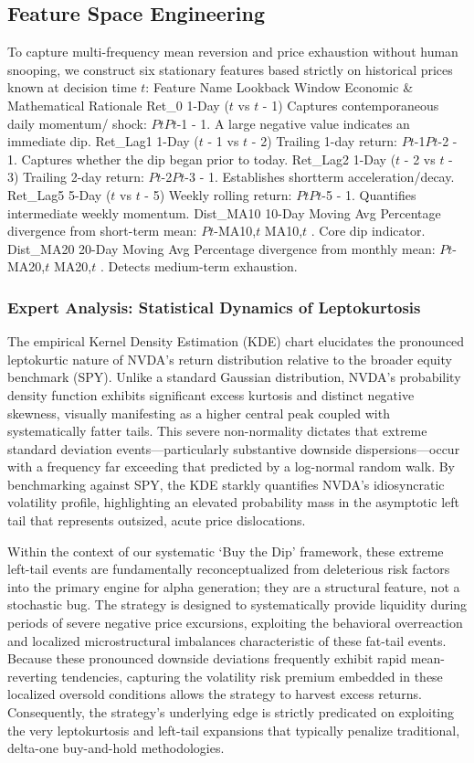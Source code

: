 \documentclass[12pt, a4paper]{article}
\begin{document}
\subsection{Feature Space Engineering}
To capture multi-frequency mean reversion and price exhaustion without human snooping, we construct 
six stationary features based strictly on historical prices known at decision time $t$:
Feature Name Lookback Window Economic \& Mathematical Rationale
Ret\_0 1-Day ($t$ vs $t$ - 1) Captures contemporaneous daily momentum/
shock: $PtP${$t$-1} - 1. A large negative value indicates 
an immediate dip.
Ret\_Lag1 1-Day ($t$ - 1 vs $t$ - 2) Trailing 1-day return: $P${$t$-1}$P${$t$-2} - 1. Captures whether 
the dip began prior to today.
Ret\_Lag2 1-Day ($t$ - 2 vs $t$ - 3) Trailing 2-day return: $P${$t$-2}$P${$t$-3} - 1. Establishes shortterm acceleration/decay.
Ret\_Lag5 5-Day ($t$ vs $t$ - 5) Weekly rolling return: $PtP${$t$-5} - 1. Quantifies intermediate weekly momentum.
Dist\_MA10 10-Day Moving Avg Percentage divergence from short-term mean: 
$Pt$-MA{10,$t$}
MA{10,$t$} . Core dip indicator.
Dist\_MA20 20-Day Moving Avg Percentage divergence from monthly mean: 
$Pt$-MA{20,$t$}
MA{20,$t$} . Detects medium-term exhaustion.


\subsubsection*{Expert Analysis: Statistical Dynamics of Leptokurtosis}
The empirical Kernel Density Estimation (KDE) chart elucidates the pronounced leptokurtic nature of NVDA's return distribution relative to the broader equity benchmark (SPY). Unlike a standard Gaussian distribution, NVDA's probability density function exhibits significant excess kurtosis and distinct negative skewness, visually manifesting as a higher central peak coupled with systematically fatter tails. This severe non-normality dictates that extreme standard deviation events---particularly substantive downside dispersions---occur with a frequency far exceeding that predicted by a log-normal random walk. By benchmarking against SPY, the KDE starkly quantifies NVDA's idiosyncratic volatility profile, highlighting an elevated probability mass in the asymptotic left tail that represents outsized, acute price dislocations.

Within the context of our systematic `Buy the Dip' framework, these extreme left-tail events are fundamentally reconceptualized from deleterious risk factors into the primary engine for alpha generation; they are a structural feature, not a stochastic bug. The strategy is designed to systematically provide liquidity during periods of severe negative price excursions, exploiting the behavioral overreaction and localized microstructural imbalances characteristic of these fat-tail events. Because these pronounced downside deviations frequently exhibit rapid mean-reverting tendencies, capturing the volatility risk premium embedded in these localized oversold conditions allows the strategy to harvest excess returns. Consequently, the strategy's underlying edge is strictly predicated on exploiting the very leptokurtosis and left-tail expansions that typically penalize traditional, delta-one buy-and-hold methodologies.
\end{document}
